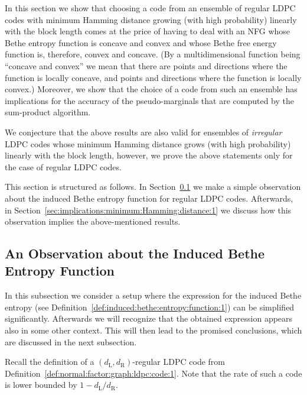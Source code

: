 \documentclass[journal, twocolumn]{IEEEtran}
\newcommand{\dleft}{d_{\mathrm{L}}}
\newcommand{\dright}{d_{\mathrm{R}}}
\newcommand{\?}{\mathrm{?}}
\begin{document}
In this section we show that choosing a code from an ensemble of regular LDPC
codes with minimum Hamming distance growing (with high probability) linearly
with the block length comes at the price of having to deal with an NFG whose
Bethe entropy function is concave and convex and whose Bethe free energy
function is, therefore, convex and concave. (By a multidimensional function
being ``concave and convex'' we mean that there are points and directions
where the function is locally concave, and points and directions where the
function is locally convex.) Moreover, we show that the choice of a code from
such an ensemble has implications for the accuracy of the pseudo-marginals
that are computed by the sum-product algorithm.

We conjecture that the above results are also valid for ensembles of
\emph{irregular} LDPC codes whose minimum Hamming distance grows (with high
probability) linearly with the block length, however, we prove the above
statements only for the case of regular LDPC codes.

This section is structured as follows. In
Section~\ref{sec:induced:Bethe:entropy:function:along:diagonal:1} we make a
simple observation about the induced Bethe entropy function for regular LDPC
codes. Afterwards, in
Section~\ref{sec:implications:minimum:Hamming:distance:1} we discuss how this
observation implies the above-mentioned results.








\subsection{An Observation about the Induced Bethe Entropy Function}
\label{sec:induced:Bethe:entropy:function:along:diagonal:1}


In this subsection we consider a setup where the expression for the induced
Bethe entropy (see Definition~\ref{def:induced:bethe:entropy:function:1}) can
be simplified significantly. Afterwards we will recognize that the obtained
expression appears also in some other context. This will then lead to the
promised conclusions, which are discussed in the next subsection.

Recall the definition of a $(\dleft, \dright)$-regular LDPC code from
Definition~\ref{def:normal:factor:graph:ldpc:code:1}. Note that the rate of
such a code is lower bounded by $1 - \dleft / \dright$.
\end{document}
